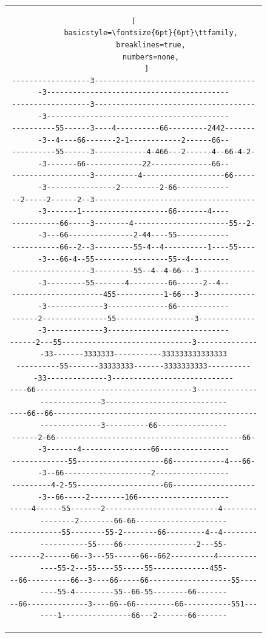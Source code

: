 \documentclass[12pt,a4paper]{article}
\begin{document}
  \begin{figure}[H]
    \centering
    \begin{tabular}{c}
      \begin{lstlisting}[
        basicstyle=\fontsize{6pt}{6pt}\ttfamily,
        breaklines=true,
        numbers=none,
      ]
------------------3--------------------------------------3------------------------------------------
------------------3--------------------------------------3------------------------------------------
----------55------3----4----------66---------2442--------3--4----66-------2-1------------2------66--
----------55------3------------4-466---2------4--66-4-2--3-------66-------------22--------------66--
------------------3----------4-------------------66------3----------------2---------2-66------------
--2-----2------2--3--------------------------------------3-------1--------------------66-------4----
-----------66-----3--------4----------------------55--2--3---66---------------2-44----55------------
-----------66--2--3---------55-4--4----------1----55-----3---66-4--55-----------------55--4---------
------------------3---------55--4--4-66---3--------------3---------55-------4---------66------2--4--
---------------------455-----------1-66---3--------------3-------------3--------------66------------
------2---------------55------------------3--------------3-------------3----------------------------
------2---55------------------------------3---------------33-------3333333-----------333333333333333
----------55-------33333333-------3333333333-----------33--------------3----------------------------
----66------------------------------------3----------------------------3----------------------------
----66--66-------------------------------------------------------------3----------66----------------
------2-66-------------------------------------------66--3-------4----------------66----------------
-------------55--------------------66------------4---66--3--66--------------------2-----------------
---------4-2-55--------------------66--------------------3--66-----2--------166---------------------
-----4------55-------2--------------------------4----------------2--------66-66---------------------
------------55--------55-2--------66---------4--4-------------------55----66-----------------2---55-
-------2------66--3---55------66--662----------4-------------55-2---55----55-----55-------------455-
--66----------66--3----66-----66-------------------55--------55-4---------55--66-55--------66-------
--66--------------3----66--66---------66-----------551-------1----------------66---2-------66-------

\end{lstlisting}
\end{tabular}
\end{figure}
\end{document}
